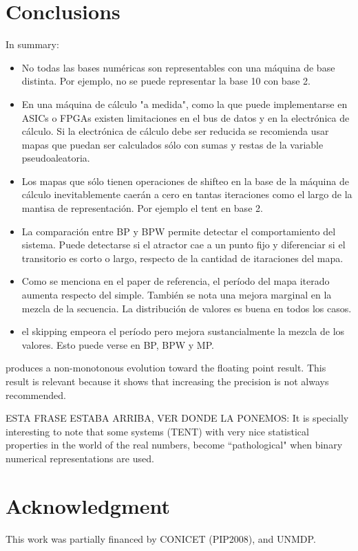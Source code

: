 \section{Conclusions}\label{sec:conclusions}
In summary:
\begin{itemize}
  \item No todas las bases numéricas son representables con una máquina de base distinta. Por ejemplo, no se puede representar la base 10 con base 2.
  \item En una máquina de cálculo "a medida", como la que puede implementarse en ASICs o FPGAs existen limitaciones en el bus de datos y en la electrónica de cálculo. Si la electrónica de cálculo debe ser reducida se recomienda usar mapas que puedan ser calculados sólo con sumas y restas de la variable pseudoaleatoria.
  \item Los mapas que sólo tienen operaciones de shifteo en la base de la máquina de cálculo inevitablemente caerán a cero en tantas iteraciones como el largo de la mantisa de representación. Por ejemplo el tent en base 2.
  \item La comparación entre BP y BPW permite detectar el comportamiento del sistema. Puede detectarse si el atractor cae a un punto fijo y diferenciar si el transitorio es corto o largo, respecto de la cantidad de itaraciones del mapa.
  \item Como se menciona en el paper de referencia, el período del mapa iterado aumenta respecto del simple. También se nota una mejora marginal en la mezcla de la secuencia. La distribución de valores es buena en todos los casos.
  \item el skipping empeora el período pero mejora sustancialmente la mezcla de los valores. Esto puede verse en BP, BPW y MP.
\end{itemize}

produces a non-monotonous evolution toward the floating point result. This result is relevant because it shows that increasing the precision is not
always recommended.

ESTA FRASE ESTABA ARRIBA, VER DONDE LA PONEMOS: It is specially interesting to note that some systems (TENT) with very nice statistical properties in the world of the real numbers, become ``pathological" when binary numerical representations are used.

\section*{Acknowledgment}
This work was partially financed by CONICET (PIP2008),  and UNMDP.
